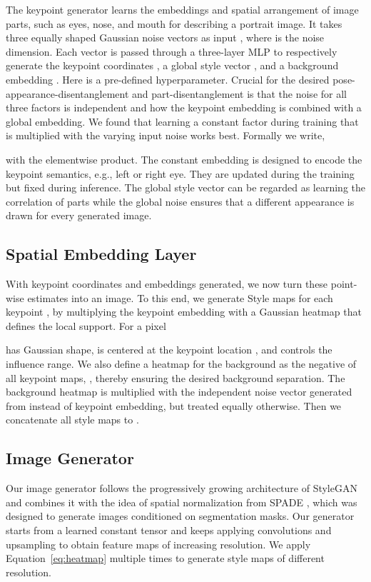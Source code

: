 \documentclass[10pt, conference, compsocconf]{IEEEtran}
\begin{document}
The keypoint generator  learns the embeddings and spatial arrangement of image parts, such as eyes, nose, and mouth for describing a portrait image. 
It takes three equally shaped Gaussian noise vectors as input , where  is the noise dimension. Each vector is passed through a three-layer MLP to respectively 
generate the  keypoint coordinates , a global style vector , and a background embedding .
Here  is a pre-defined hyperparameter.
Crucial for the desired pose-appearance-disentanglement and part-disentanglement is that the noise for all three factors is independent and how the keypoint embedding  is combined with a global embedding. We found that learning a constant factor during training that is multiplied with the varying input noise works best. Formally we write,

with  the elementwise product. The constant embedding  is designed to
encode the keypoint semantics, e.g., left or right eye. They are updated during the training but fixed during inference. The
global style vector  can be regarded as 
learning the correlation of parts while the global noise ensures that a different appearance is drawn for every generated image. 


\subsection{Spatial Embedding Layer}
\label{sec: embedding layer}
With keypoint coordinates and embeddings generated, we now turn these point-wise estimates into an image. 
To this end, we generate Style maps  for each keypoint ,
by multiplying the keypoint embedding  with a Gaussian heatmap  that defines the local support. For a pixel 

has Gaussian shape, is centered at the keypoint location , and  controls the influence range. We also define a heatmap  for the background as the negative of all keypoint maps, , thereby ensuring the desired background separation. The background heatmap is multiplied with the independent noise vector  generated from  instead of keypoint embedding, but treated equally otherwise.
Then we concatenate all  style maps 
to . 


\subsection{Image Generator} \label{sec:image_generator}

Our image generator  follows the progressively growing architecture of StyleGAN \cite{karras2019style} and combines it with the idea of spatial normalization from SPADE \cite{park2019semantic}, which was designed to generate images conditioned on segmentation masks. 
Our generator starts from a learned  constant tensor and keeps applying convolutions and upsampling to obtain feature maps of increasing resolution. 
We apply Equation~\ref{eq:heatmap} multiple times to generate style maps of different resolution.
\end{document}
